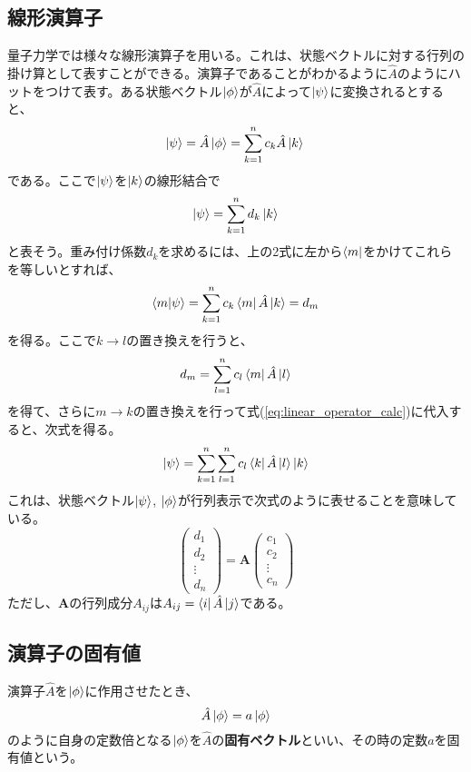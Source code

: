 \subsection{線形演算子}
量子力学では様々な線形演算子を用いる。これは、状態ベクトルに対する行列の掛け算として表すことができる。演算子であることがわかるように$\hat A$のようにハットをつけて表す。ある状態ベクトル$\ket \phi$が$\hat A$によって$\ket \psi$に変換されるとすると、
\begin{equation}
	\ket \psi = \hat A \ket \phi
= \sum_{k = 1}^n c_k \hat A \ket k\\
\end{equation}
である。ここで$\ket \psi$を$\ket k$の線形結合で
\begin{equation}
	\ket \psi = \sum_{k = 1}^n d_k \ket k
	\label{eq:linear_operator_calc}
\end{equation}
と表そう。重み付け係数$d_k$を求めるには、上の2式に左から$\bra m$をかけてこれらを等しいとすれば、
\begin{equation}
	\braket {m|\psi} = \sum_{k = 1}^n c_k \bra m \hat A \ket k = d_m
\end{equation}
を得る。ここで$k \to l$の置き換えを行うと、
\begin{equation}
  d_m = \sum_{l = 1}^n c_l \bra m \hat A \ket l
\end{equation}
を得て、さらに$m \to k$の置き換えを行って式(\ref{eq:linear_operator_calc})に代入すると、次式を得る。
\begin{equation}
  \ket \psi = \sum_{k = 1}^n \sum_{l = 1}^n c_l \bra k \hat A \ket l \ket k
\end{equation}
これは、状態ベクトル$\ket \psi$, $\ket \phi$が行列表示で次式のように表せることを意味している。
\begin{equation}
  \left( \begin{array}{c}
  	d_1 \\ d_2 \\ \vdots \\ d_n
  \end{array} \right) = \pmb A 
  \left( \begin{array}{c}
  c_1\\c_2\\ \vdots \\c_n
 \end{array}\right)
\end{equation}
ただし、$\pmb A$の行列成分${A_{ij}}$は$A_{ij} = \bra i \hat A \ket j$である。

\subsection{演算子の固有値}
演算子$\hat A$を$\ket \phi$に作用させたとき、
\begin{equation}
  \hat A \ket \phi = a \ket \phi
  \label{eq:eigenequation}
\end{equation}
のように自身の定数倍となる$\ket \phi$を$\hat A$の\textbf{固有ベクトル}といい、その時の定数$a$を固有値という。

